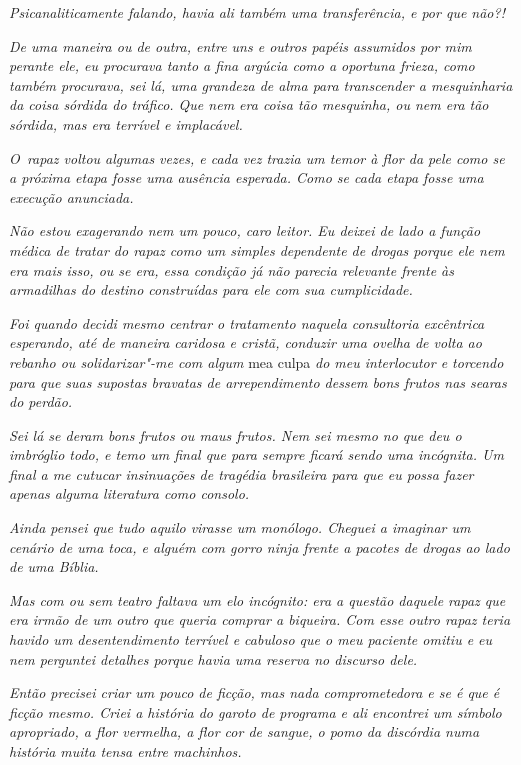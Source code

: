 \emph{Psicanaliticamente falando, havia ali também uma transferência, e
por que não?!}

\emph{De uma maneira ou de outra, entre uns e outros papéis assumidos
por mim perante ele, eu procurava tanto a fina argúcia como a oportuna
frieza, como também procurava, sei lá, uma grandeza de alma para
transcender a mesquinharia da coisa sórdida do tráfico. Que nem era
coisa tão mesquinha, ou nem era tão sórdida, mas era terrível e
implacável.}~

\emph{O~rapaz voltou algumas vezes, e cada vez trazia um temor à flor da
pele como se a próxima etapa fosse uma ausência esperada. Como se cada
etapa fosse uma execução anunciada.}~

\emph{Não estou exagerando nem um pouco, caro leitor. Eu deixei de lado
a função médica de tratar do rapaz como um simples dependente de drogas
porque ele nem era mais isso, ou se era, essa condição já não parecia
relevante frente às armadilhas do destino construídas para ele com sua
cumplicidade.}~

\emph{Foi quando decidi mesmo centrar o tratamento naquela consultoria
excêntrica esperando, até de maneira caridosa e cristã, conduzir uma
ovelha de volta ao rebanho ou solidarizar"-me com algum} mea culpa \emph{do meu
interlocutor e torcendo para que suas supostas bravatas de
arrependimento dessem bons frutos nas searas do perdão.}

\emph{Sei lá se deram bons frutos ou maus frutos. Nem sei mesmo no que
deu o imbróglio todo, e temo um final que para sempre ficará sendo uma
incógnita. Um final a me cutucar insinuações de tragédia brasileira para
que eu possa fazer apenas alguma literatura como consolo.}~

\emph{Ainda pensei que tudo aquilo virasse um monólogo. Cheguei a
imaginar um cenário de uma toca, e alguém com gorro ninja frente a
pacotes de drogas ao lado de uma Bíblia.}~

\emph{Mas com ou sem teatro faltava um elo incógnito: era a questão
daquele rapaz que era irmão de um outro que queria comprar a biqueira.
Com esse outro rapaz teria havido um desentendimento terrível e cabuloso
que o meu paciente omitiu e eu nem perguntei detalhes porque havia uma
reserva no discurso dele.}~

\emph{Então precisei criar um pouco de ficção, mas nada comprometedora e
se é que é ficção mesmo. Criei a história do garoto de programa e ali
encontrei um símbolo apropriado, a flor vermelha, a flor cor de sangue,
o pomo da discórdia numa história muita tensa entre machinhos.}~

